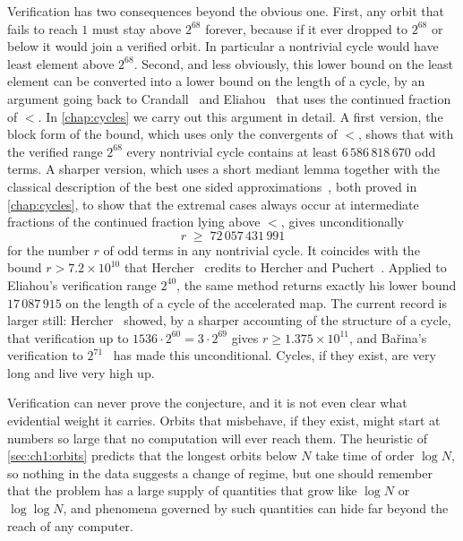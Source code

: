 Verification has two consequences beyond the obvious one. First, any orbit
that fails to reach $1$ must stay above $2^{68}$ forever, because if it ever
dropped to $2^{68}$ or below it would join a verified orbit. In particular a
nontrivial cycle would have least element above $2^{68}$. Second, and less
obviously, this lower bound on the least element can be converted into a lower
bound on the length of a cycle, by an argument going back to
Crandall~\cite{crandall1978} and
Eliahou~\cite{eliahou1993} that uses the continued fraction of $\lt$. In
\cref{chap:cycles} we carry out this argument in detail.
A first version, the block form of the bound, which uses only the convergents of $\lt$, shows that with the verified range $2^{68}$ every nontrivial cycle contains at least $6\,586\,818\,670$ odd terms.
A sharper version, which uses a short mediant lemma together with the classical description of the best one sided approximations~\cite[Theorem~4.5(ii)]{hancl2019}, both proved in \cref{chap:cycles}, to show that the extremal cases always occur at intermediate fractions of the continued fraction lying above $\lt$,
gives unconditionally
\[
  r\;\geq\;72\,057\,431\,991
\]
for the number $r$ of odd terms in any nontrivial cycle. It coincides with the
bound $r>7.2\times10^{10}$ that Hercher~\cite{hercher2023} credits to
Hercher and Puchert~\cite{hercher2018,puchert2018}. Applied to Eliahou's
verification range $2^{40}$, the same method returns exactly his lower bound
$17\,087\,915$ on the length of a cycle of the accelerated map. The
current record is larger still: Hercher~\cite[Corollary~29]{hercher2023}
showed, by a sharper accounting of the structure of a cycle, that verification
up to $1536\cdot2^{60}=3\cdot2^{69}$ gives $r\geq1.375\times10^{11}$, and
Ba\v{r}ina's verification to $2^{71}$~\cite{barina2025} has made this
unconditional. Cycles, if they exist, are very long and live very
high up.

Verification can never prove the conjecture, and it is not even clear what
evidential weight it carries. Orbits that misbehave, if they exist, might
start at numbers so large that no computation will ever reach them. The
heuristic of \cref{sec:ch1:orbits} predicts that the longest orbits below $N$
take time of order $\log N$, so nothing in the data suggests a change of
regime, but one should remember that the problem has a large supply of
quantities that grow like $\log N$ or $\log\log N$, and phenomena governed by
such quantities can hide far beyond the reach of any computer.

